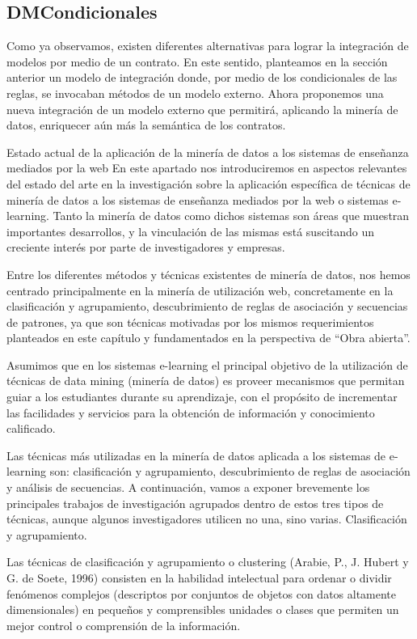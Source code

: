 \begin{itemize}
\subsection{DMCondicionales}

Como ya observamos, existen diferentes alternativas para lograr la integración
de modelos por medio de un contrato. En este sentido, planteamos en
la sección anterior un modelo de integración donde, por medio de los condicionales
de las reglas, se invocaban métodos de un modelo externo.
Ahora proponemos una nueva integración de un modelo externo que permitirá,
aplicando la minería de datos, enriquecer aún más la semántica de
los contratos.

Estado actual de la aplicación de la minería de datos a los sistemas
de enseñanza mediados por la web
En este apartado nos introduciremos en aspectos relevantes del estado del arte
en la investigación sobre la aplicación específica de técnicas de minería de
datos a los sistemas de enseñanza mediados por la web o sistemas e-learning.
Tanto la minería de datos como dichos sistemas son áreas que muestran
importantes desarrollos, y la vinculación de las mismas está suscitando un creciente
interés por parte de investigadores y empresas.

Entre los diferentes métodos y técnicas existentes de minería de datos,
nos hemos centrado principalmente en la minería de utilización web, concretamente
en la clasificación y agrupamiento, descubrimiento de reglas de asociación
y secuencias de patrones, ya que son técnicas motivadas por los
mismos requerimientos planteados en este capítulo y fundamentados en la
perspectiva de “Obra abierta”.

Asumimos que en los sistemas e-learning el principal objetivo de la utilización
de técnicas de data mining (minería de datos) es proveer mecanismos
que permitan guiar a los estudiantes durante su aprendizaje, con el propósito
de incrementar las facilidades y servicios para la obtención de información y
conocimiento calificado.

Las técnicas más utilizadas en la minería de datos aplicada a los sistemas
de e-learning son: clasificación y agrupamiento, descubrimiento de reglas de
asociación y análisis de secuencias. A continuación, vamos a exponer brevemente
los principales trabajos de investigación agrupados dentro de estos tres
tipos de técnicas, aunque algunos investigadores utilicen no una, sino varias.
Clasificación y agrupamiento.

Las técnicas de clasificación y agrupamiento o clustering (Arabie, P., J. Hubert
y G. de Soete, 1996) consisten en la habilidad intelectual para ordenar o dividir
fenómenos complejos (descriptos por conjuntos de objetos con datos altamente
dimensionales) en pequeños y comprensibles unidades o clases que
permiten un mejor control o comprensión de la información.


\end{itemize}
